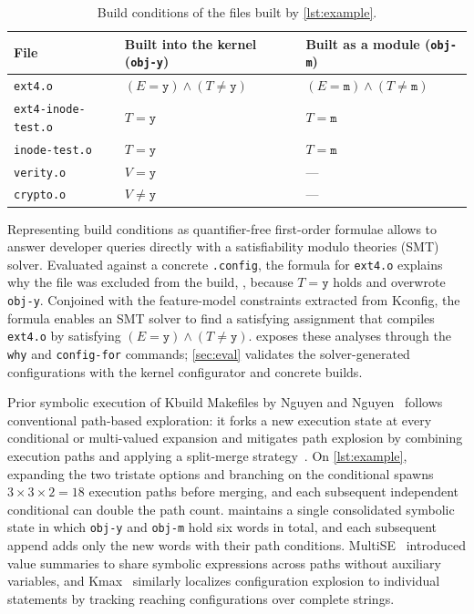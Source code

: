 \documentclass[acmsmall,screen,review,anonymous,nonacm]{acmart}
\begin{document}
  \begin{table}[t]
  \centering\footnotesize
  \caption{Build conditions of the files built by \autoref{lst:example}.}
  \label{tab:example}
  \begin{tabular}{lll}
  \toprule
  File & Built into the kernel (\texttt{obj-y}) & Built as a module (\texttt{obj-m}) \\
  \midrule
  \texttt{ext4.o} & $(E = \mathtt{y}) \land (T \ne \mathtt{y})$ & $(E = \mathtt{m}) \land (T \ne \mathtt{m})$ \\
  \texttt{ext4-inode-test.o} & $T = \mathtt{y}$ & $T = \mathtt{m}$ \\
  \texttt{inode-test.o} & $T = \mathtt{y}$ & $T = \mathtt{m}$ \\
  \texttt{verity.o} & $V = \mathtt{y}$ & --- \\
  \texttt{crypto.o} & $V \ne \mathtt{y}$ & --- \\
  \bottomrule
  \end{tabular}
  \end{table}

  Representing build conditions as quantifier-free first-order formulae allows \tool{} to answer developer queries directly with a satisfiability modulo theories (SMT) solver.
  Evaluated against a concrete \texttt{.config}, the formula for \texttt{ext4.o} explains why the file was excluded from the build, \eg, because $T = \mathtt{y}$ holds and overwrote \texttt{obj-y}.
  Conjoined with the feature-model constraints extracted from Kconfig, the formula enables an SMT solver to find a satisfying assignment that compiles \texttt{ext4.o} by satisfying $(E = \mathtt{y}) \land (T \ne \mathtt{y})$.
  \tool{} exposes these analyses through the \texttt{why} and \texttt{config-for} commands; \autoref{sec:eval} validates the solver-generated configurations with the kernel configurator and concrete builds.

  Prior symbolic execution of Kbuild Makefiles by Nguyen and Nguyen~\cite{nguyen2020kbuild} follows conventional path-based exploration: it forks a new execution state at every conditional or multi-valued expansion and mitigates path explosion by combining execution paths and applying a split-merge strategy~\cite{avgerinos2014enhancing,sen2015multise}.
  On \autoref{lst:example}, expanding the two tristate options and branching on the conditional spawns $3 \times 3 \times 2 = 18$ execution paths before merging, and each subsequent independent conditional can double the path count.
  \tool{} maintains a single consolidated symbolic state in which \texttt{obj-y} and \texttt{obj-m} hold six words in total, and each subsequent append adds only the new words with their path conditions.
  MultiSE~\cite{sen2015multise} introduced value summaries to share symbolic expressions across paths without auxiliary variables, and Kmax~\cite{gazzillo2017kmax} similarly localizes configuration explosion to individual statements by tracking reaching configurations over complete strings.
\end{document}
